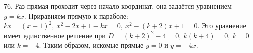 76. Раз прямая проходит через начало координат, она задаётся уравнением $y=kx.$ Приравняем прямую к параболе: $kx=(x-1)^2,\ x^2-2x+1-kx=0,\ x^2-(k+2)x+1=0.$ Это уравнение имеет единственное решение при $D=(k+2)^2-4=0,\ k(k+4)=0,\ k=0$ или $k=-4.$ Таким образом, искомые прямые $y=0$ и $y=-4x.$\\
